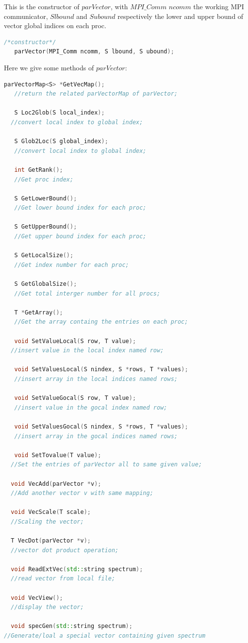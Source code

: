 \documentclass[a4paper, 10 pt]{report}
\begin{document}
This is the constructor of $parVector$, with $MPI\_Comm$ $ncomm$ the working MPI communicator, $S$$ lbound$ and $S$$ ubound$ respectively the lower and upper bound of vector global indices on each proc.
\begin{lstlisting}[language=C++,frame=single]
   /*constructor*/
   parVector(MPI_Comm ncomm, S lbound, S ubound);
\end{lstlisting}

Here we give some methods of $parVector$:

   	\begin{lstlisting}[language=C++,frame=single]
   parVectorMap<S> *GetVecMap();
   //return the related parVectorMap of parVector;

   S Loc2Glob(S local_index);
  //convert local index to global index;

   S Glob2Loc(S global_index);
   //convert local index to global index;
   
   int GetRank();
   //Get proc index;
   
   S GetLowerBound();
   //Get lower bound index for each proc;
   
   S GetUpperBound();
   //Get upper bound index for each proc;
   
   S GetLocalSize();
   //Get index number for each proc;
   
   S GetGlobalSize();
   //Get total interger number for all procs;
   
   T *GetArray();
   //Get the array containg the entries on each proc;
  
   void SetValueLocal(S row, T value);
  //insert value in the local index named row;
  
   void SetValuesLocal(S nindex, S *rows, T *values);
   //insert array in the local indices named rows;
 
   void SetValueGocal(S row, T value);
   //insert value in the gocal index named row;

   void SetValuesGocal(S nindex, S *rows, T *values);
   //insert array in the gocal indices named rows;
 
   void SetTovalue(T value);
  //Set the entries of parVector all to same given value;
  
  void VecAdd(parVector *v);
  //Add another vector v with same mapping;
  
  void VecScale(T scale);
  //Scaling the vector;
  
  T VecDot(parVector *v);
  //vector dot product operation;
  
  void ReadExtVec(std::string spectrum);
  //read vector from local file;
  
  void VecView();
  //display the vector;
  
  void specGen(std::string spectrum);
//Generate/loal a special vector containing given spectrum
  
   \end{lstlisting}
	
\end{document}
